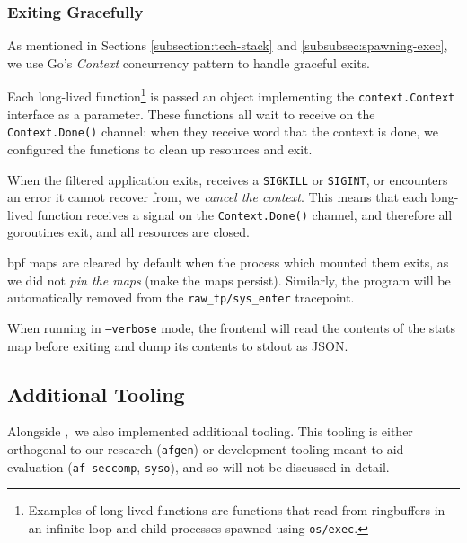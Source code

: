 \subsubsection{Exiting Gracefully}

As mentioned in Sections \ref{subsection:tech-stack} and 
\ref{subsubsec:spawning-exec}, we use Go's \textit{Context} concurrency pattern
to handle graceful exits. 

Each long-lived function\footnote{Examples of long-lived functions are functions
that read from ringbuffers in an infinite loop and child processes spawned using
\texttt{os/exec}.} is passed an object implementing the 
\texttt{context.Context} interface as a parameter. These functions all wait to
receive on the \texttt{Context.Done()} channel: when they receive word that the
context is done, we configured the functions to clean up resources and exit. 

When the filtered application exits, receives a \texttt{SIGKILL} or 
\texttt{SIGINT}, or \af encounters an error it cannot recover from, we 
\textit{cancel the context}. This means that each long-lived function receives 
a signal on the \texttt{Context.Done()} channel, and therefore all goroutines 
exit, and all resources are closed.

\ac{bpf} maps are cleared by default when the process which mounted them exits,
as we did not \textit{pin the maps} (make the maps persist). Similarly, the \af
program will be automatically removed from the \texttt{raw\_tp/sys\_enter}
tracepoint.

When running in \texttt{--verbose} mode, the frontend will read the contents of
the stats map before exiting and dump its contents to \ac{stdout} as JSON.


\subsection{Additional Tooling}

Alongside \afss,~we also implemented additional tooling. This tooling is either
orthogonal to our research (\texttt{afgen}) or development tooling
meant to aid evaluation (\texttt{af-seccomp}, \texttt{syso}), and so will not be
discussed in detail. 


